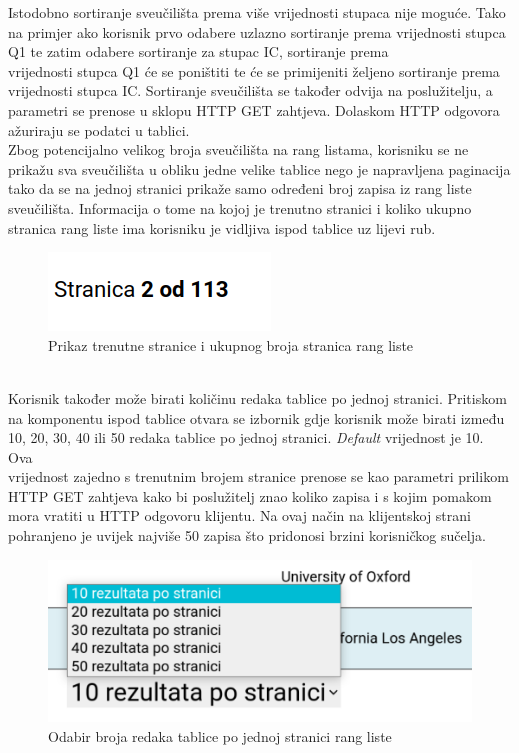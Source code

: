 \documentclass[times, utf8, zavrsni]{fer}
\begin{document}
Istodobno sortiranje sveučilišta prema više vrijednosti stupaca nije moguće. Tako na primjer ako korisnik prvo odabere uzlazno sortiranje prema vrijednosti stupca 
Q1 te zatim odabere sortiranje za stupac IC, sortiranje prema \\vrijednosti stupca Q1 će se poništiti te će se primijeniti željeno sortiranje prema \\vrijednosti stupca IC.
Sortiranje sveučilišta se također odvija na 
poslužitelju, a parametri se prenose u sklopu HTTP GET zahtjeva. Dolaskom HTTP odgovora ažuriraju se podatci u tablici.
\\Zbog potencijalno velikog broja sveučilišta na rang listama, korisniku se ne prikažu sva sveučilišta u obliku jedne velike tablice nego 
je napravljena paginacija tako da se na jednoj stranici prikaže samo određeni broj zapisa iz rang liste sveučilišta. Informacija o tome na kojoj je trenutno stranici i 
koliko ukupno stranica rang liste ima korisniku je vidljiva ispod tablice uz lijevi rub. 
\begin{figure}[htb]
    \centering
       \includegraphics[scale=0.3]{stranica.png} 
       \caption{Prikaz trenutne stranice i ukupnog broja stranica rang liste}
       \label{fig:paginacija}
       \end{figure}
\\Korisnik također može birati količinu redaka tablice po jednoj stranici. Pritiskom na komponentu ispod tablice otvara se 
izbornik gdje korisnik može birati između 10, 20, 30, 40 ili 50 redaka tablice po jednoj stranici. \emph{Default} vrijednost je 10. Ova \\vrijednost zajedno s 
trenutnim brojem stranice prenose se kao parametri prilikom HTTP GET zahtjeva kako bi poslužitelj znao koliko zapisa i s kojim pomakom mora vratiti u 
HTTP odgovoru klijentu. Na ovaj način na klijentskoj strani pohranjeno je uvijek najviše 50 zapisa što pridonosi brzini korisničkog sučelja.
\begin{figure}[htb]
    \centering
       \includegraphics[scale=0.3]{brojstranica.png} 
       \caption{Odabir broja redaka tablice po jednoj stranici rang liste}
       \label{fig:brojstranica}
       \end{figure}
\end{document}

